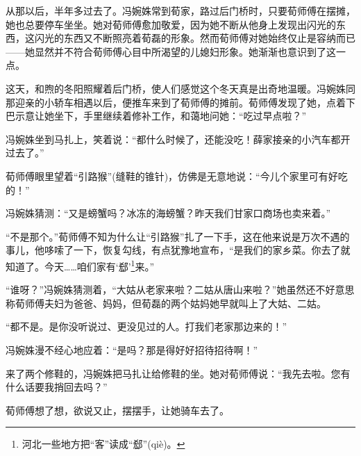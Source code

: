 \par 从那以后，半年多过去了。冯婉姝常到荀家，路过后门桥时，只要荀师傅在摆摊，她也总要停车坐坐。她对荀师傅愈加敬爱，因为她不断从他身上发现出闪光的东西，这闪光的东西又不断照亮着荀磊的形象。然而荀师傅对她始终仅止是容纳而已——她显然并不符合荀师傅心目中所渴望的儿媳妇形象。她渐渐也意识到了这一点。
\par 这天，和煦的冬阳照耀着后门桥，使人们感觉这个冬天真是出奇地温暖。冯婉姝同那迎亲的小轿车相遇以后，便推车来到了荀师傅的摊前。荀师傅发现了她，点着下巴示意让她坐下，手里继续着修补工作，和蔼地问她：“吃过早点啦？”
\par 冯婉姝坐到马扎上，笑着说：“都什么时候了，还能没吃！薛家接亲的小汽车都开过去了。”
\par 荀师傅眼里望着“引路猴”(缝鞋的锥针)，仿佛是无意地说：“今儿个家里可有好吃的！”
\par 冯婉姝猜测：“又是螃蟹吗？冰冻的海螃蟹？昨天我们甘家口商场也卖来着。”
\par “不是那个。”荀师傅不知为什么让“引路猴”扎了一下手，这在他来说是万次不遇的事儿，他哆嗦了一下，恢复勾线，有点犹豫地宣布，“是我们的家乡菜。你去了就知道了。今天……咱们家有‘郄’\footnote{河北一些地方把“客”读成“郄”(qiè)。}来。”
\par “谁呀？”冯婉姝猜测着，“大姑从老家来啦？二姑从唐山来啦？”她虽然还不好意思称荀师傅夫妇为爸爸、妈妈，但荀磊的两个姑妈她早就叫上了大姑、二姑。
\par “都不是。是你没听说过、更没见过的人。打我们老家那边来的！”
\par 冯婉姝漫不经心地应着：“是吗？那是得好好招待招待啊！”
\par 来了两个修鞋的，冯婉姝把马扎让给修鞋的坐。她对荀师傅说：“我先去啦。您有什么话要我捎回去吗？”
\par 荀师傅想了想，欲说又止，摆摆手，让她骑车去了。
